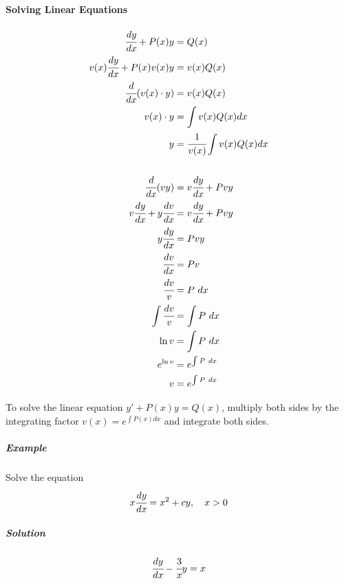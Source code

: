 \documentclass{article}
\begin{document}
            \paragraph{Solving Linear Equations}
            \begin{equation}
                \begin{aligned}
                    \cfrac{dy}{dx}+P(x)y&=Q(x)\\
                    v(x)\cfrac{dy}{dx}+P(x)v(x)y&=v(x)Q(x)\\
                    \cfrac{d}{dx}(v(x)\cdot y)&=v(x)Q(x)\\
                    v(x)\cdot y&=\int v(x)Q(x)dx\\
                    y&=\cfrac{1}{v(x)}\int v(x)Q(x)dx\\
                    &\\
                    \cfrac{d}{dx}(vy)&=v\cfrac{dy}{dx}+Pvy\\
                    v\cfrac{dy}{dx}+y\cfrac{dv}{dx}&=v\cfrac{dy}{dx}+Pvy\\
                    y\cfrac{dy}{dx}&=Pvy\\
                    \cfrac{dv}{dx}&=Pv\\
                    \cfrac{dv}{v}&=P\ dx\\
                    \int \cfrac{dv}{v}&=\int P\ dx\\
                    \ln v&=\int P\ dx\\
                    e^{\ln v}&=e^{\int P\ dx}\\
                    v&=e^{\int P\ dx}\\
                \end{aligned}
            \end{equation}
            \par To solve the linear equation $y'+P(x)y=Q(x)$, multiply both sides by the integrating factor $v(x)=e^{\int P(x)dx}$ and integrate both sides.
                \subparagraph{Example} Solve the equation
                \[x\cfrac{dy}{dx}=x^2+cy,\quad x>0\]
                \subparagraph{Solution}
                \[\cfrac{dy}{dx}-\cfrac{3}{x}y=x\]
\end{document}
